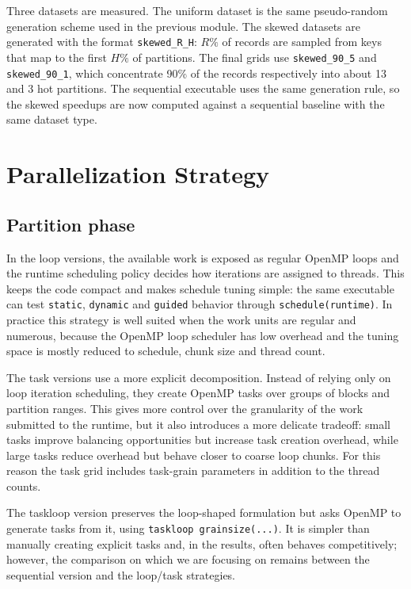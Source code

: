 \documentclass[11pt,a4paper]{article}
\begin{document}
Three datasets are measured. The uniform dataset is the same pseudo-random generation scheme used in the previous module. The skewed datasets are generated with the format \texttt{skewed\_R\_H}: \(R\%\) of records are sampled from keys that map to the first \(H\%\) of partitions. The final grids use \texttt{skewed\_90\_5} and \texttt{skewed\_90\_1}, which concentrate 90\% of the records respectively into about 13 and 3 hot partitions. The sequential executable uses the same generation rule, so the skewed speedups are now computed against a sequential baseline with the same dataset type.


\section{Parallelization Strategy}

\subsection{Partition phase}
In the loop versions, the available work is exposed as regular OpenMP loops and the runtime scheduling policy decides how iterations are assigned to threads. This keeps the code compact and makes schedule tuning simple: the same executable can test \texttt{static}, \texttt{dynamic} and \texttt{guided} behavior through \texttt{schedule(runtime)}. In practice this strategy is well suited when the work units are regular and numerous, because the OpenMP loop scheduler has low overhead and the tuning space is mostly reduced to schedule, chunk size and thread count.

The task versions use a more explicit decomposition. Instead of relying only on loop iteration scheduling, they create OpenMP tasks over groups of blocks and partition ranges. This gives more control over the granularity of the work submitted to the runtime, but it also introduces a more delicate tradeoff: small tasks improve balancing opportunities but increase task creation overhead, while large tasks reduce overhead but behave closer to coarse loop chunks. For this reason the task grid includes task-grain parameters in addition to the thread counts.

The taskloop version preserves the loop-shaped formulation but asks OpenMP to generate tasks from it, using \texttt{taskloop grainsize(...)}. It is simpler than manually creating explicit tasks and, in the results, often behaves competitively; however, the comparison on which we are focusing on remains between the sequential version and the loop/task strategies.
\end{document}
